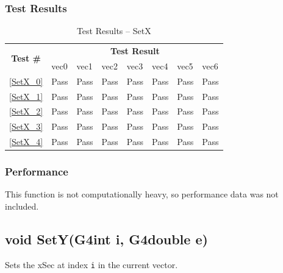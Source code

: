 \documentclass[12pt]{article}
\begin{document}
	\subsubsection{Test Results}
		\begin{table}[H]
		\centering
		\caption{Test Results -- SetX}\label{SetX_acc}
		\begin{tabular}{clllllll}
		\toprule
		\multirow{2}{*}{\bf Test \#} & \multicolumn{7}{c}{\bf Test Result}\\
		& vec0 & vec1 & vec2 & vec3 & vec4 & vec5 & vec6\\\midrule
		\ref{SetX_0} & Pass & Pass & Pass & Pass & Pass & Pass & Pass\\
		\ref{SetX_1} & Pass & Pass & Pass & Pass & Pass & Pass & Pass\\
		\ref{SetX_2} & Pass & Pass & Pass & Pass & Pass & Pass & Pass\\
		\ref{SetX_3} & Pass & Pass & Pass & Pass & Pass & Pass & Pass\\
		\ref{SetX_4} & Pass & Pass & Pass & Pass & Pass & Pass & Pass\\
		\bottomrule
		\end{tabular}
		\end{table}

	\subsubsection{Performance}
		This function is not computationally heavy, so performance data was not included.

\subsection{void SetY(G4int i, G4double e)} %
	
	Sets the xSec at index \texttt{i} in the current vector. 
	
\end{document}
